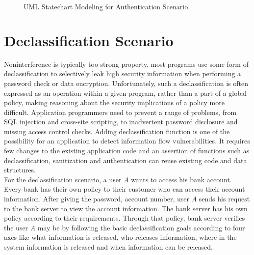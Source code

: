 \begin{figure}[htbp]
	\centering
	\label{authentication_scenario}
	\caption{UML Statechart Modeling for Authentication Scenario}
\end{figure}

\section{Declassification Scenario}
 Noninterference is typically
 too strong property, most programs use some form of declassification to selectively leak high security information when performing a password check or data encryption. Unfortunately, such  a declassification is often expressed as an operation within a given  program, rather than a part of a global policy, making reasoning about the security implications of a policy more difficult. Application programmers need to prevent a range of problems, from SQL injection and cross-site scripting, to inadvertent password disclosure and missing access control checks. Adding declassification function is one of the possibility for an application to detect information flow vulnerabilities. It requires few changes to the existing application code and an assertion of functions such as declassification, sanitization and authentication can reuse existing code and data structures. \\
 
 For the declassification scenario, a user \emph{A} wants to access his bank account. Every bank has their own policy to their customer who can access their account information. After giving the password, account number, user \emph{A} sends his request to the bank server to view the account information. The bank server has his own policy according to their requirements. Through that policy, bank server verifies the user \emph{A} may be by following the basic declassification goals according to four axes like what information is released,
 who releases information, where in the system information is released and when information can be released.  \\
 
